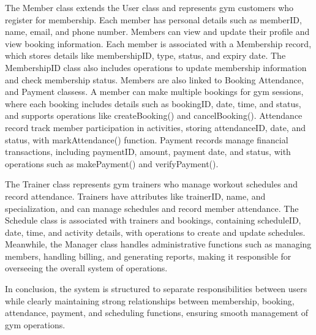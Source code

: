 \documentclass[12pt, a4paper]{article}
\begin{document}
The Member class extends the User class and represents gym customers who register for membership. 
Each member has personal details such as memberID, name, email, and phone number. 
Members can view and update their profile and view booking information. 
Each member is associated with a Membership record, which stores details like membershipID, type, status, and expiry date. 
The MembershipID class also includes operations to update membership information and check membership status. 
Members are also linked to Booking Attendance, and Payment classess.
A member can make multiple bookings for gym sessions, where each booking includes details such as bookingID, date, time, and status, and supports operations like createBooking() and cancelBooking(). 
Attendance record track member participation in activities, storing attendanceID, date, and status, with markAttendance() function. 
Payment records manage financial transactions, including paymentID, amount, payment date, and status, with operations such as makePayment() and verifyPayment(). 

The Trainer class represents gym trainers who manage workout schedules and record attendance. 
Trainers have attributes like trainerID, name, and specialization, and can manage schedules and record member attendance. 
The Schedule class is associated with trainers and bookings, containing scheduleID, date, time, and activity details, with operations to create and update schedules. 
Meanwhile, the Manager class handles administrative functions such as managing members, handling billing, and generating reports, making it responsible for overseeing the overall system of operations. 

In conclusion, the system is structured to separate responsibilities between users while clearly maintaining strong relationships between membership, booking, attendance, payment, and scheduling functions, ensuring smooth management of gym operations. 
\end{document}
